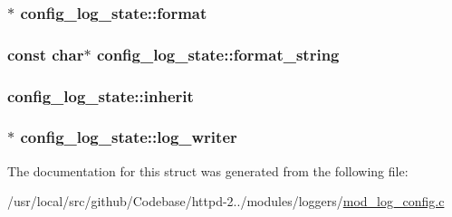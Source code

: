 \subsubsection[{\texorpdfstring{format}{format}}]{$\ast$ config\+\_\+log\+\_\+state\+::format}\hypertarget{structconfig__log__state_af42f80d176582ade7a4ccd39da3219e6}{}\label{structconfig__log__state_af42f80d176582ade7a4ccd39da3219e6}
\subsubsection[{\texorpdfstring{format\+\_\+string}{format_string}}]{\setlength{\rightskip}{0pt plus 5cm}const char$\ast$ config\+\_\+log\+\_\+state\+::format\+\_\+string}\hypertarget{structconfig__log__state_a8bca6ebd3c2662b41557cbb54347aed9}{}\label{structconfig__log__state_a8bca6ebd3c2662b41557cbb54347aed9}
\subsubsection[{\texorpdfstring{inherit}{inherit}}]{ config\+\_\+log\+\_\+state\+::inherit}\hypertarget{structconfig__log__state_a32f311f0d30084289e41ba6ea00e71c4}{}\label{structconfig__log__state_a32f311f0d30084289e41ba6ea00e71c4}
\subsubsection[{\texorpdfstring{log\+\_\+writer}{log_writer}}]{$\ast$ config\+\_\+log\+\_\+state\+::log\+\_\+writer}\hypertarget{structconfig__log__state_a8dd142a982c92388f8e875042a7de150}{}\label{structconfig__log__state_a8dd142a982c92388f8e875042a7de150}


The documentation for this struct was generated from the following file\+:\begin{DoxyCompactItemize}
\item 
/usr/local/src/github/\+Codebase/httpd-\/2../modules/loggers/\hyperlink{mod__log__config_8c}{mod\+\_\+log\+\_\+config.\+c}\end{DoxyCompactItemize}
